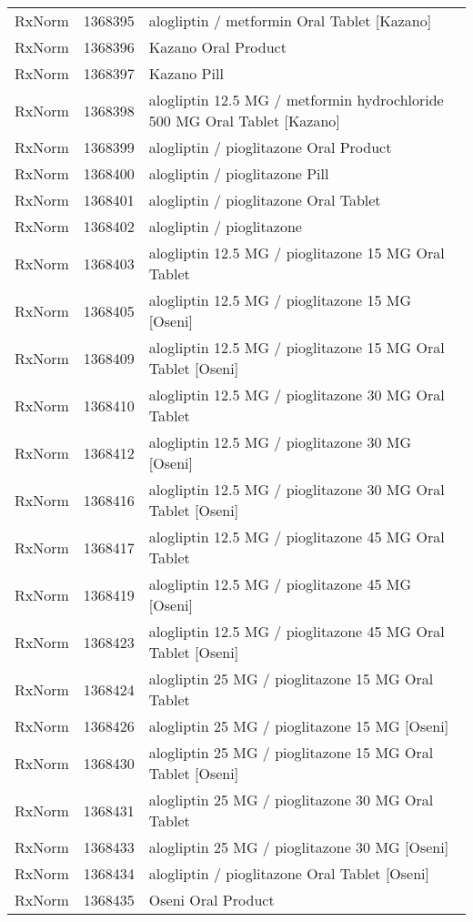 \begin{longtable}{p{}p{}p{}}
  RxNorm & 1368395 & alogliptin / metformin Oral Tablet [Kazano] \\ 
  RxNorm & 1368396 & Kazano Oral Product \\ 
  RxNorm & 1368397 & Kazano Pill \\ 
  RxNorm & 1368398 & alogliptin 12.5 MG / metformin hydrochloride 500 MG Oral Tablet [Kazano] \\ 
  RxNorm & 1368399 & alogliptin / pioglitazone Oral Product \\ 
  RxNorm & 1368400 & alogliptin / pioglitazone Pill \\ 
  RxNorm & 1368401 & alogliptin / pioglitazone Oral Tablet \\ 
  RxNorm & 1368402 & alogliptin / pioglitazone \\ 
  RxNorm & 1368403 & alogliptin 12.5 MG / pioglitazone 15 MG Oral Tablet \\ 
  RxNorm & 1368405 & alogliptin 12.5 MG / pioglitazone 15 MG [Oseni] \\ 
  RxNorm & 1368409 & alogliptin 12.5 MG / pioglitazone 15 MG Oral Tablet [Oseni] \\ 
  RxNorm & 1368410 & alogliptin 12.5 MG / pioglitazone 30 MG Oral Tablet \\ 
  RxNorm & 1368412 & alogliptin 12.5 MG / pioglitazone 30 MG [Oseni] \\ 
  RxNorm & 1368416 & alogliptin 12.5 MG / pioglitazone 30 MG Oral Tablet [Oseni] \\ 
  RxNorm & 1368417 & alogliptin 12.5 MG / pioglitazone 45 MG Oral Tablet \\ 
  RxNorm & 1368419 & alogliptin 12.5 MG / pioglitazone 45 MG [Oseni] \\ 
  RxNorm & 1368423 & alogliptin 12.5 MG / pioglitazone 45 MG Oral Tablet [Oseni] \\ 
  RxNorm & 1368424 & alogliptin 25 MG / pioglitazone 15 MG Oral Tablet \\ 
  RxNorm & 1368426 & alogliptin 25 MG / pioglitazone 15 MG [Oseni] \\ 
  RxNorm & 1368430 & alogliptin 25 MG / pioglitazone 15 MG Oral Tablet [Oseni] \\ 
  RxNorm & 1368431 & alogliptin 25 MG / pioglitazone 30 MG Oral Tablet \\ 
  RxNorm & 1368433 & alogliptin 25 MG / pioglitazone 30 MG [Oseni] \\ 
  RxNorm & 1368434 & alogliptin / pioglitazone Oral Tablet [Oseni] \\ 
  RxNorm & 1368435 & Oseni Oral Product \\ 

\end{longtable}
